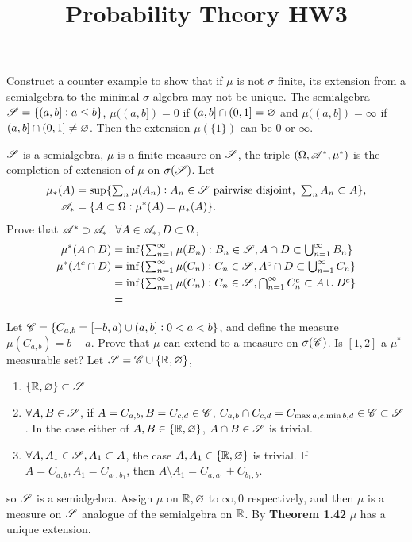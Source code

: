 

\title{Probability Theory HW3}
\author{\asemail}
\maketitle

\begin{enumerate}
	\isep[1em]
	\prob
	Construct a counter example to show that if $\mu$ is not $\sigma$ finite, its extension from a semialgebra to the minimal $\sigma$-algebra may not be unique.
	\soln
	The semialgebra $\mathscr{S}=\{(a,b]:a\leq b\}$, $\mu((a,b])=0$ if $(a,b]\cap (0,1]=\varnothing$ and $\mu((a,b])=\infty$ if $(a,b]\cap (0,1]\neq\varnothing$. Then the extension $\mu(\{1\})$ can be $0$ or $\infty$.

	\prob
	$\mathscr{S}$ is a semialgebra, $\mu$ is a finite measure on $\mathscr{S}$, the triple $(\Omega, \mathscr{A}^*, \mu^*)$ is the completion of extension of $\mu$ on $\sigma(\mathscr{S})$. Let
		\begin{align*}
			\mu_*(A) & =\sup\{\textstyle\sum_n \mu(A_n): A_n\in\mathscr{S} \text{ pairwise disjoint, }\textstyle\sum_n A_n\subset A\},
			\\ \mathscr{A}_*&=\{A\subset \Omega:\mu^*(A)=\mu_*(A)\}.
		\end{align*}
		Prove that $\mathscr{A}^*\supset\mathscr{A}_*$.
	\soln
	$\forall A\in\mathscr{A}_*,D\subset \Omega$,
		\begin{align*}
			\mu^*(A\cap D) & =\inf\{\textstyle\sum_{n=1}^\infty \mu(B_n): B_n\in\mathscr{S},A\cap D\subset \textstyle\bigcup_{n=1}^\infty B_n\}
			\\ \mu^*(A^c\cap D) & =\inf\{\textstyle\sum_{n=1}^\infty \mu(C_n): C_n\in\mathscr{S},A^c\cap D\subset \textstyle\bigcup_{n=1}^\infty C_n\}
			\\ &=\inf\{\textstyle\sum_{n=1}^\infty \mu(C_n): C_n\in\mathscr{S},\textstyle\bigcap_{n=1}^\infty C_n^c\subset A\cup D^c\}
			\\ &=
		\end{align*}
		\medskip

		\prob
		Let $\mathscr{C}=\{C_{a,b}=[-b,a)\cup(a,b]:0<a<b\}$, and define the measure $\mu(C_{a,b})=b-a$. Prove that $\mu$ can extend to a measure on $\sigma(\mathscr{C})$. Is $[1,2]$ a $\mu^*$-measurable set?
		\soln
		Let $\mathscr{S}=\mathscr{C}\cup \{\mathbb{R}, \varnothing\}$,
		\begin{enumerate}
			\item $\{\mathbb{R}, \varnothing\}\subset \mathscr{S}$
			\item $\forall A,B\in \mathscr{S}$, if $A=C_{a,b},B=C_{c,d}\in \mathscr{C}$, $C_{a,b}\cap C_{c,d}=C_{\max{a,c},\min{b,d}}\in \mathscr{C}\subset \mathscr{S}$. In the case either of $A,B\in\{\mathbb{R}, \varnothing\}$, $A\cap B\in \mathscr{S}$ is trivial.
			\item $\forall A,A_1\in \mathscr{S}, A_1\subset A$, the case $A,A_1\in\{\mathbb{R},\varnothing\}$ is trivial. If $A=C_{a,b},A_1=C_{a_1,b_1}$, then $A\setminus A_1=C_{a,a_1}+C_{b_1,b}$.
		\end{enumerate}
		so $\mathscr{S}$ is a semialgebra. Assign $\mu$ on $\mathbb{R},\varnothing$ to $\infty,0$ respectively, and then $\mu$ is a measure on $\mathscr{S}$ analogue of the semialgebra on $\mathbb{R}$. By \textbf{Theorem 1.42} $\mu$ has a unique extension.


\end{enumerate}
